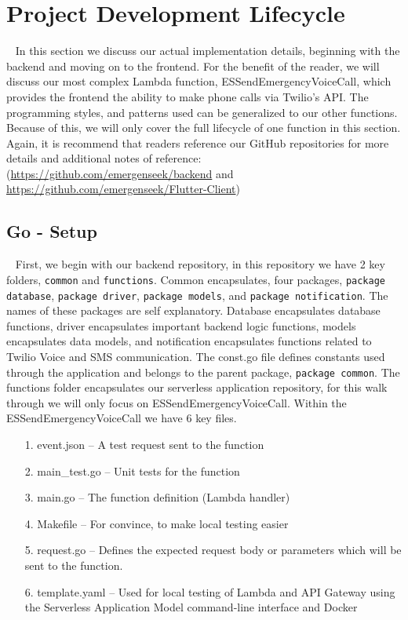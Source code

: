 \documentclass[10pt, a4paper]{article}
\begin{document}
\section{Project Development Lifecycle} 
\label{sec:pdl}
\par ~ In this section we discuss our actual implementation details, beginning with the backend and moving on to the frontend. For the benefit of the reader, we will discuss our most complex Lambda function, ESSendEmergencyVoiceCall, which provides the frontend the ability to make phone calls via Twilio's API. The programming styles, and patterns used can be generalized to our other functions. Because of this, we will only cover the full lifecycle of one function in this section. Again, it is recommend that readers reference our GitHub repositories for more details and additional notes of reference: (\url{https://github.com/emergenseek/backend} and \url{https://github.com/emergenseek/Flutter-Client}) 

\subsection{Go - Setup}
\par ~ First, we begin with our backend repository, in this repository we have 2 key folders, \texttt{common} and \texttt{functions}. Common encapsulates, four packages, \texttt{package database}, \texttt{package driver}, \texttt{package models}, and \texttt{package notification}. The names of these packages are self explanatory. Database encapsulates database functions, driver encapsulates important backend logic functions, models encapsulates data models, and notification encapsulates functions related to Twilio Voice and SMS communication. The const.go file defines constants used through the application and belongs to the parent package, \texttt{package common}. The functions folder encapsulates our serverless application repository, for this walk through we will only focus on ESSendEmergencyVoiceCall. Within the ESSendEmergencyVoiceCall we have 6 key files. 
\begin{enumerate}
	\item[1.] event.json -- A test request sent to the function
	\item[2.] main\_test.go -- Unit tests for the function
	\item[3.] main.go -- The function definition (Lambda handler)
	\item[4.] Makefile -- For convince, to make local testing easier
	\item[5.] request.go -- Defines the expected request body or parameters which will be sent to the function. 
	\item[6.] template.yaml -- Used for local testing of Lambda and API Gateway using the Serverless Application Model command-line interface and Docker
\end{enumerate}
\end{document}
